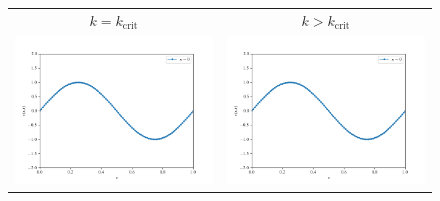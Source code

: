 \documentclass[12pt, reqno]{report}
\theoremstyle{definition}
\theoremstyle{remark}
\begin{document}
\begin{figure}[H] 
    \centering

    \begin{tabular}{cc}
        $k=k_\text{crit}$ & $k>k_\text{crit}$ \\
        \includegraphics[width = \acfdwidth]{media_paper/stable_CH_FD_0} & 
        \includegraphics[width = \acfdwidth]{media_paper/unstable_CH_FD_0} \\

\end{tabular}
\end{figure}
\end{document}
